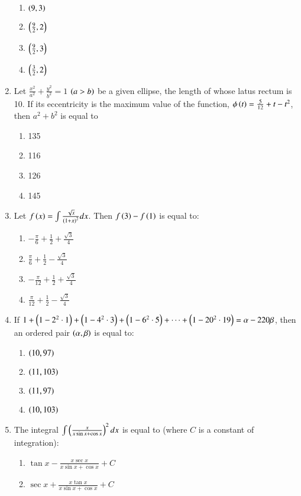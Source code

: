\documentclass[journal]{IEEEtran}
\begin{document}
\begin{enumerate}
\begin{enumerate}
    \item $\left(9,3\right)$
    \item $\left(\frac{9}{2},2\right)$
    \item $\left(\frac{9}{2},3\right)$
    \item $\left(\frac{3}{2},2\right)$
\end{enumerate}
\item Let $\frac{x^2}{a^2}+\frac{y^2}{b^2}=1$ $\left(a>b\right)$ be a given ellipse, the length of whose latus rectum is 10. If its eccentricity is the maximum value of the function, $\phi\left(t\right)=\frac{5}{12}+t-t^2$, then $a^2 + b^2$ is equal to
\begin{enumerate}
    \item 135
    \item 116
    \item 126
    \item 145
\end{enumerate}
\item Let $f\left(x\right)=\int\frac{\sqrt{x}}{\left(1+x\right)^2} dx$. Then $f\left(3\right)-f\left(1\right)$ is equal to:
\begin{enumerate}
    \item $-\frac{\pi}{6}+\frac{1}{2}+\frac{\sqrt{3}}{4}$
    \item $\frac{\pi}{6}+\frac{1}{2}-\frac{\sqrt{3}}{4}$
    \item $-\frac{\pi}{12}+\frac{1}{2}+\frac{\sqrt{3}}{4}$
    \item $\frac{\pi}{12}+\frac{1}{2}-\frac{\sqrt{3}}{4}$
\end{enumerate}
\item If $1+\left(1-2^2\cdot1\right)+\left(1-4^2\cdot3\right)+\left(1-6^2\cdot5\right)+\cdots+\left(1-20^2\cdot19\right)=\alpha-220\beta$, then an ordered pair $\left(\alpha,\beta\right)$ is equal to:
\begin{enumerate}
    \item $\left(10, 97\right)$
    \item $\left(11, 103\right)$
    \item $\left(11, 97\right)$
    \item $\left(10,103\right)$
\end{enumerate}
\item The integral $\int\left(\frac{x}{x\sin x+\cos x}\right)^2 dx$ is equal to (where $C$ is a constant of integration):
\begin{enumerate}
    \item $\tan x-\frac{x\sec x}{x\sin x+\cos x}+C$
    \item $\sec x+\frac{x\tan x}{x\sin x+\cos x}+C$

\end{enumerate}
\end{enumerate}
\end{document}
